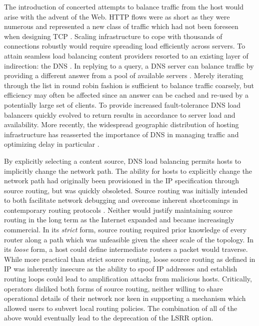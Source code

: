 The introduction of concerted attempts to balance traffic from the host would arise with the advent of the Web.
\ac{HTTP} flows were as short as they were numerous and represented a new class of traffic which had not been foreseen when designing \ac{TCP} \cite{Day:2010p187}.
Scaling infrastructure to cope with thousands of connections robustly would require spreading load efficiently across servers.
To attain seamless load balancing content providers resorted to an existing layer of indirection: the \ac{DNS} \cite{Mockapetris:1987p527}.
In replying to a query, a \ac{DNS} server can balance traffic by providing a different answer from a pool of available servers \cite{Brisco:1995p448}.
Merely iterating through the list in round robin fashion is sufficient to balance traffic coarsely, but efficiency may often be affected since an answer can be cached and re-used by a potentially large set of clients.
To provide increased fault-tolerance \ac{DNS} load balancers quickly evolved to return results in accordance to server load and availability.
More recently, the widespread geographic distribution of hosting infrastructure has reasserted the importance of \ac{DNS} in managing traffic and optimizing delay in particular \cite{Ager:2011p528}.

By explicitly selecting a content source, \ac{DNS} load balancing permits hosts to implicitly change the network path.
The ability for hosts to explicitly change the network path had originally been provisioned in the \ac{IP} specification through source routing, but was quickly obsoleted.
Source routing was initially intended to both facilitate network debugging and overcome inherent shortcomings in contemporary routing protocols \cite{Sunshine:1977p152}.
Neither would justify maintaining source routing in the long term as the Internet expanded and became increasingly commercial.
In its \emph{strict} form, source routing required prior knowledge of every router along a path which was unfeasible given the sheer scale of the topology.
In its \emph{loose} form, a host could define intermediate routers a packet would traverse. 
While more practical than strict source routing, loose source routing as defined in \ac{IP} was inherently insecure as the ability to spoof \ac{IP} addresses and establish routing loops could lead to amplification attacks from malicious hosts.
Critically, operators disliked both forms of source routing, neither willing to share operational details of their network nor keen in supporting a mechanism which allowed users to subvert local routing policies.
The combination of all of the above would eventually lead to the deprecation of the \ac{LSRR} option.

